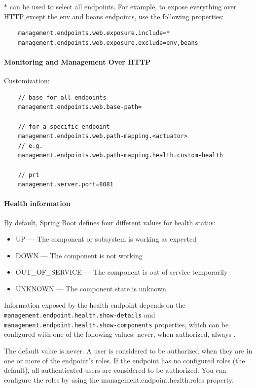 \documentclass{scrartcl}
\begin{document}
* can be used to select all endpoints. For example, to expose everything over HTTP except the env and beans endpoints, use the following properties:

\begin{lstlisting}
    management.endpoints.web.exposure.include=*
    management.endpoints.web.exposure.exclude=env,beans

\end{lstlisting}

\paragraph{Monitoring and Management Over HTTP}

Customization:

\begin{lstlisting}
    // base for all endpoints
    management.endpoints.web.base-path=

    // for a specific endpoint
    management.endpoints.web.path-mapping.<actuator>
    // e.g.
    management.endpoints.web.path-mapping.health=custom-health

    // prt
    management.server.port=8081
\end{lstlisting}



\paragraph{Health information}

By default, Spring Boot defines four different values for health status:

\begin{itemize}
    \item UP — The component or subsystem is working as expected
    \item DOWN — The component is not working
    \item OUT\_OF\_SERVICE — The component is out of service temporarily
    \item UNKNOWN — The component state is unknown
\end{itemize}

Information exposed by the health endpoint depends on the \lstinline|management.endpoint.health.show-details| and \lstinline|management.endpoint.health.show-components| properties, which can be configured with one of the following values: never, when-authorized, always
.

The default value is never. A user is considered to be authorized when they are in one or more of the endpoint’s roles. If the endpoint has no configured roles (the default), all authenticated users are considered to be authorized. You can configure the roles by using the management.endpoint.health.roles property.
\end{document}
